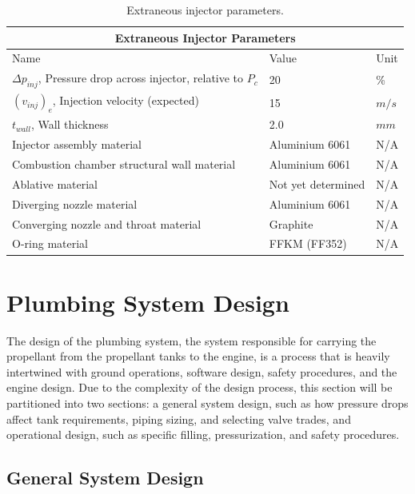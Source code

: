 \documentclass[9pt]{article} %
\numberwithin{equation}{section} %
\begin{document}
\begin{table}[!htb]
\centering
\begin{tabular}{  |p{8cm}||p{3cm}|p{1cm}|  }
\hline
\multicolumn{3}{|c|}{Extraneous Injector Parameters} \\
\hline
Name & Value & Unit \\ 
\hline
$\Delta p_{inj}$, Pressure drop across injector, relative to $P_{c}$ & 20 & \%  \\
$(v_{inj})_{e}$, Injection velocity (expected) & 15 &  $m/s$ \\
$t_{wall}$, Wall thickness & 2.0 & $mm$ \\
Injector assembly material & Aluminium 6061 & N/A \\
Combustion chamber structural wall material & Aluminium 6061 & N/A \\
Ablative material & Not yet determined & N/A \\
Diverging nozzle material & Aluminium 6061 & N/A \\
Converging nozzle and throat material & Graphite & N/A \\
O-ring material & FFKM (FF352) & N/A \\
\hline
\end{tabular}
\caption{Extraneous injector parameters.}
\label{table:injector_extraneous}
\end{table}

\section{Plumbing System Design}

\hspace{\parindent} The design of the plumbing system, the system responsible for carrying the propellant from the propellant tanks to the engine, is a process that is heavily intertwined with ground operations, software design, safety procedures, and the engine design. Due to the complexity of the design process, this section will be partitioned into two sections: a general system design, such as how pressure drops affect tank requirements, piping sizing, and selecting valve trades, and operational design, such as specific filling, pressurization, and safety procedures.

\subsection{General System Design}
\end{document}
